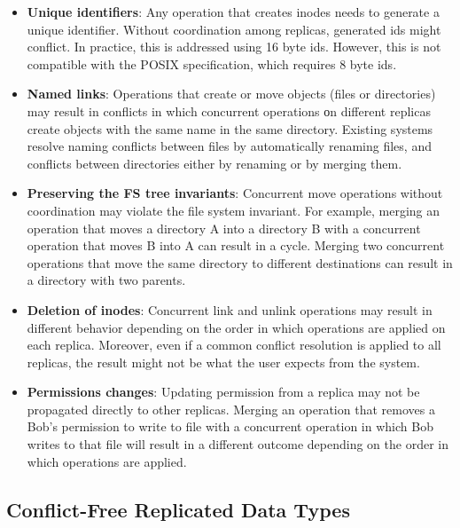\documentclass[sigconf,anonymous,10pt]{acmart}
\begin{document}
\begin{itemize}
	\item \textbf{Unique identifiers}: Any operation that creates
	inodes needs to generate a unique identifier.
	Without coordination among replicas, generated ids might conflict.
	In practice, this is addressed using 16 byte ids.
	However, this is not compatible with the POSIX specification, which requires 8 byte ids.
	\item \textbf{Named links}: Operations that create or move objects (files or directories)
	may result in conflicts in which concurrent operations οn different replicas create
	objects with the same name in the same directory.
	Existing systems resolve naming conflicts between files by automatically renaming
  files, and conflicts between directories either by renaming or by merging them.
	\item \textbf{Preserving the FS tree invariants}: Concurrent move
	operations without coordination may violate the file system invariant.
  For example, merging an operation that moves a directory A into a
	directory B with a concurrent operation that moves B into A can result in a cycle.
  Merging two concurrent operations that move the same directory
	to different destinations can result in a directory with two parents.
  \item \textbf{Deletion of inodes}: Concurrent link and unlink operations may result in different behavior depending on the order in which operations are applied on each replica.
  Moreover, even if a common conflict resolution is applied to all replicas, the
  result might not be what the user expects from the system.
	\item \textbf{Permissions changes}: Updating permission from a replica may not
  be propagated directly to other replicas.
  Merging an operation that removes a Bob's permission to write to file with a
  concurrent operation in which Bob writes
  to that file will result in a different outcome depending on the order in which
  operations are applied.
\end{itemize}

\subsection{Conflict-Free Replicated Data Types}
\end{document}

